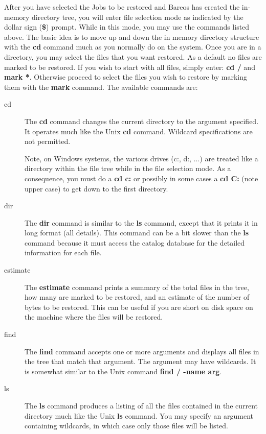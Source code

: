 After you have selected the Jobs to be restored and Bareos has created the
in-memory directory tree, you will enter file selection mode as indicated by
the dollar sign ({\bf \$}) prompt. While in this mode, you may use the
commands listed above. The basic idea is to move up and down the in memory
directory structure with the {\bf cd} command much as you normally do on the
system. Once you are in a directory, you may select the files that you want
restored. As a default no files are marked to be restored. If you wish to
start with all files, simply enter: {\bf cd /} and {\bf mark *}. Otherwise
proceed to select the files you wish to restore by marking them with the {\bf
mark} command. The available commands are:

\begin{description}

\item [cd]
  The {\bf cd} command changes the current directory to the argument specified.
  It operates much like the Unix {\bf cd} command.  Wildcard specifications are
  not permitted.

  Note, on Windows systems, the various drives (c:, d:, ...) are treated like a
  directory within the file tree while in the file selection mode. As a
  consequence, you must do a {\bf cd c:} or possibly in some cases a {\bf cd
    C:} (note upper case) to get down to the first directory.

\item [dir]
   The {\bf dir} command is similar to the {\bf ls} command, except that it
   prints it in long format (all details). This command can be a bit slower
   than the {\bf ls} command because it must access the catalog database for
   the detailed information for each file.

\item [estimate]
   The {\bf estimate} command prints a summary of the total files in the tree,
   how many are marked to be restored, and an estimate of the number of bytes
   to be restored. This can be useful if you are short on disk space on the
   machine where the files will be restored.

\item [find]
   The {\bf find} command accepts one or more arguments  and displays all files
   in the tree that match that argument. The argument  may have wildcards. It is
   somewhat similar to the Unix command  {\bf find / -name arg}.

\item [ls]
   The {\bf ls} command produces a listing of all the files  contained in the
   current directory much like the Unix {\bf ls} command.  You may specify an
   argument containing wildcards, in which case only  those files will be
   listed.


\end{description}
